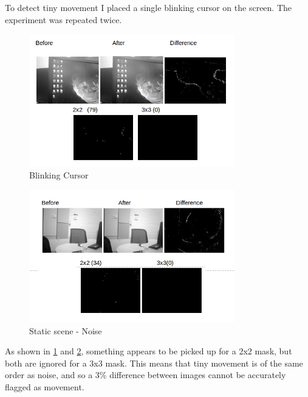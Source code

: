 \documentclass[11pt]{article} %
\begin{document}
To  detect tiny movement I placed a single blinking cursor on the screen. The experiment was repeated twice.
\begin{figure}
	\vspace{-20pt}
	\begin{center}
		\includegraphics[width=0.8\textwidth]{../images/ImageOps/CURSOR1}
	\end{center}
	\vspace{-20pt}
	\caption{Blinking Cursor}
	\label{img:curse1}
\end{figure}
\begin{figure}
	\begin{center}
		\includegraphics[width=0.8\textwidth]{../images/ImageOps/CURSOR2}
	\end{center}
	\vspace{-20pt}
	\caption{Static scene - Noise}
	\label{fig:curse2}
\end{figure}

As shown in \cref{img:curse1} and \cref{fig:curse2}, something appears to be picked up for a 2x2 mask, but both are ignored for a 3x3 mask. This means that tiny movement is of the same order as noise, and so a 3\% difference between images cannot be accurately flagged as movement.
\end{document}
